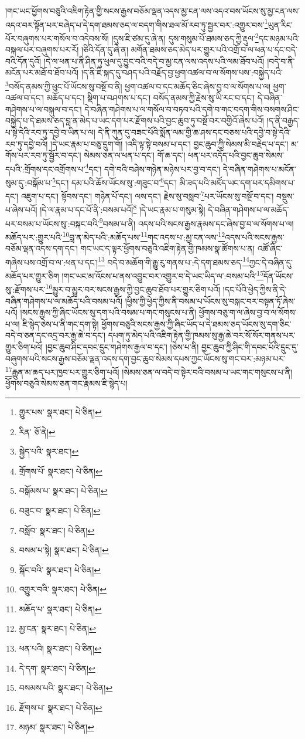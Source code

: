 །གང་ཡང་ཕྱོགས་བཅུའི་འཇིག་རྟེན་གྱི་སངས་རྒྱས་བཅོམ་ལྡན་འདས་མྱ་ངན་ལས་འདའ་བས་ཡོངས་སུ་མྱ་ངན་ལས་འདའ་བར་སྟོན་པར་བཞེད་པ་དེ་དག་ཐམས་ཅད་ལ་བདག་གིས་ཐལ་མོ་རབ་ཏུ་སྦྱར་བར་:འགྱུར་བས་\footnote{གྱུར་པས་  སྣར་ཐང་།  པེ་ཅིན། }ཡུན་རིང་པོར་བཞུགས་པར་གསོལ་བ་འདེབས་སོ། །དུས་ཇི་ཙམ་དུ་ཞེ་ན། དུས་གསུམ་པོ་ཐམས་ཅད་ཀྱི་རྡུལ་\footnote{རིན་  ཅོ་ནེ། }དང་མཉམ་པའི་བསྐལ་པར་བཞུགས་པར་རོ། །ཅིའི་དོན་དུ་ཞེ་ན། མགོན་ཐམས་ཅད་མེད་པར་གྱུར་པའི་འགྲོ་བ་ལ་ཕན་པ་དང་བདེ་བའི་དོན་དུའོ། །དེ་ལ་ཕན་པ་ནི་ཤིན་ཏུ་ཕུལ་དུ་བྱུང་བའི་བདེ་བ་མྱ་ངན་ལས་འདས་པའི་ལམ་ཐོབ་པའོ། །བདེ་བ་ནི་མངོན་པར་མཐོ་བ་ཐོབ་པའོ། །ད་ནི་ཇི་སྐད་དུ་བཤད་པའི་བརྗོད་བྱ་ཕྱག་འཚལ་བ་ལ་སོགས་པས་:བསྐྱེད་པའི་\footnote{སྐྱེད་པའི་  སྣར་ཐང་། }བསོད་ནམས་ཀྱི་ཕུང་པོ་ཡོངས་སུ་བསྔོ་བ་ནི། ཕྱག་འཚལ་བ་དང་མཆོད་ཅིང་ཞེས་བྱ་བ་ལ་སོགས་པ་ལ། ཕྱག་འཚལ་བ་དང་། མཆོད་པ་དང་། སྡིག་པ་བཤགས་པ་དང་། བསོད་ནམས་ཀྱི་རྗེས་སུ་ཡི་རང་བ་དང་། དེ་བཞིན་གཤེགས་པ་ལ་བསྐུལ་བ་དང་། དེ་བཞིན་གཤེགས་པ་ལ་གསོལ་བ་བཏབ་པའི་དགེ་བ་གང་བདག་གིས་བསགས་ཤིང་བསྐྱེད་པ་དེ་ཐམས་ཅད་བླ་ན་མེད་པ་ཡང་དག་པར་རྫོགས་པའི་བྱང་ཆུབ་ཏུ་བསྔོ་བར་བགྱིའོ་ཞེས་པའོ། །ད་ནི་བརྒྱད་པ་སྟེ་དེའི་རབ་ཏུ་དབྱེ་བ་ཡིན་པ་ལ། དེ་ནི་ཀུན་དུ་བཟང་པོའི་སྨོན་ལམ་གྱི་ཆ་ཤས་དང་བཅས་པའི་དབྱེ་བ་སྟེ་དེའི་རབ་ཏུ་དབྱེ་བའོ། །དེ་ཡང་རྣམ་པ་བཅུ་དྲུག་གོ། །འདི་ལྟ་སྟེ་བསམ་པ་དང་། བྱང་ཆུབ་ཀྱི་སེམས་མི་བརྗེད་པ་དང་། མ་གོས་པར་རབ་ཏུ་སྦྱོར་བ་དང་། སེམས་ཅན་ལ་ཕན་པ་དང་། གོ་ཆ་དང་། ཕན་པར་འདོད་པའི་བྱང་ཆུབ་སེམས་དཔའི་:གྲོགས་དང་འགྲོགས་པ་\footnote{གྲོགས་པོ་  སྣར་ཐང་།  པེ་ཅིན། }དང་། དགེ་བའི་བཤེས་གཉེན་མཉེས་པར་བྱ་བ་དང་། དེ་བཞིན་གཤེགས་པ་མངོན་སུམ་དུ་:བསྒོམ་པ་\footnote{བསྒོམས་པ་  སྣར་ཐང་།  པེ་ཅིན། }དང་། དམ་པའི་ཆོས་ཡོངས་སུ་:གཟུང་བ་\footnote{བཟུང་བ་  སྣར་ཐང་།  པེ་ཅིན། }དང་། མི་ཟད་པའི་མཛོད་ཡང་དག་པར་དམིགས་པ་དང་། འཇུག་པ་དང་། སྟོབས་དང་། གཉེན་པོ་དང་། ལས་དང་། རྗེས་སུ་བསླབ་\footnote{བསློབ་  སྣར་ཐང་།  པེ་ཅིན། }པར་ཡོངས་སུ་བསྔོ་བ་དང་། བསྡུས་པ་ཞེས་པའོ། །དེ་ལ་རྣམ་པ་དང་པོ་ནི་:བསམ་པའོ།\footnote{བསམ་པ་སྟེ།  སྣར་ཐང་།  པེ་ཅིན། } །དེ་ཡང་རྣམ་པ་གསུམ་སྟེ། དེ་བཞིན་གཤེགས་པ་ལ་མཆོད་པར་བསམ་པ་ཡོངས་སུ་:བསྐང་བའི་\footnote{སྐོང་བའི་  སྣར་ཐང་།  པེ་ཅིན། }བསམ་པ་ནི། འདས་པའི་སངས་རྒྱས་རྣམས་དང་ཞེས་བྱ་བ་ལ་སོགས་པ་ལ། མཆོད་པར་:གྱུར་པའི་\footnote{འགྱུར་བའི་  སྣར་ཐང་།  པེ་ཅིན། }བླ་ན་མེད་པའི་:མཆོད་པས་\footnote{མཆོད་པ་  སྣར་ཐང་།  པེ་ཅིན། }གང་འདས་པ་:མྱ་ངན་ལས་\footnote{མྱ་ངན་  སྣར་ཐང་།  པེ་ཅིན། }འདས་པའི་སངས་རྒྱས་བཅོམ་ལྡན་འདས་དག་དང་། གང་ཡང་ད་ལྟར་ཕྱོགས་བཅུའི་འཇིག་རྟེན་གྱི་ཁམས་སྣ་ཚོགས་པ་ན། འཚོ་ཞིང་གཞེས་པས་འགྲོ་བ་ལ་:ཕན་པ་དང་།\footnote{ཕན་པའི།  སྣར་ཐང་།  པེ་ཅིན། } བདེ་བ་མཆོག་གི་རྒྱུ་རུ་གནས་པ་:དེ་དག་ཐམས་ཅད་\footnote{དེ་དག་  སྣར་ཐང་།  པེ་ཅིན། }ཀྱང་དེ་བཞིན་དུ་མཆོད་པར་གྱུར་ཅིག །གང་ཡང་མ་འོངས་པ་ནས་འབྱུང་བར་འགྱུར་བ་དེ་ཡང་ཡིད་ལ་:བསམ་པའི་\footnote{བསམས་པའི་  སྣར་ཐང་།  པེ་ཅིན། }དོན་ཡོངས་སུ་:རྫོགས་པར་\footnote{རྫོགས་པ་  སྣར་ཐང་།  པེ་ཅིན། }མྱུར་བ་མྱུར་བར་སངས་རྒྱས་ཀྱི་བྱང་ཆུབ་ཐོབ་པར་གྱུར་ཅིག་པའོ། །དང་པོའི་ཕྱེད་ཀྱིས་ནི་དེ་བཞིན་གཤེགས་པ་ལ་མཆོད་པའི་བསམ་པའོ། །ཕྱིས་ཀྱི་ཕྱེད་ཀྱིས་ནི་བསམ་པ་ཡོངས་སུ་བསྐང་བར་བསྟན་ཏོ་ཞེས་པའོ། །སངས་རྒྱས་ཀྱི་ཞིང་ཡོངས་སུ་དག་པའི་བསམ་པ་གང་གསུངས་པ་ནི། ཕྱོགས་བཅུ་ག་ལ་ཞེས་བྱ་བ་ལ་སོགས་པ་ལ། ཇི་སྙེད་ཅེས་པ་ནི་གང་དག་སྟེ། ཕྱོགས་བཅུའི་སངས་རྒྱས་ཀྱི་ཞིང་ཡོད་པ་དེ་ཐམས་ཅད་ཡོངས་སུ་དག་ཅིང་བདེ་བ་ཅན་དང་འདྲ་བར་རྒྱ་ཆེ་བ་དང་། དཔག་ཏུ་མེད་པའི་འཇིག་རྟེན་གྱི་ཁམས་སུ་རྒྱ་ཆེ་བར་སོ་སོར་གནས་པར་གྱུར་ཅིག་པའོ། །བྱང་ཆུབ་ཤིང་དབང་དྲུང་གཤེགས་རྒྱལ་བ་དང་། །ཅེས་པ་ནི། བྱང་ཆུབ་ཀྱི་ཤིང་གི་དབང་པོའི་དྲུང་དུ་བཞུགས་པའི་སངས་རྒྱས་བཅོམ་ལྡན་འདས་དག་བྱང་ཆུབ་སེམས་དཔས་ཀྱང་ཡོངས་སུ་གང་བར་:མཉམ་པར་\footnote{མཉམ་  སྣར་ཐང་།  པེ་ཅིན། }རྒྱུན་མ་ཆད་པར་ཁྱབ་པར་གྱུར་ཅིག་པའོ། །སེམས་ཅན་ལ་བདེ་བ་སྟེར་བའི་བསམ་པ་ཡང་གང་གསུངས་པ་ནི། ཕྱོགས་བཅུའི་སེམས་ཅན་གང་རྣམས་ཇི་སྙེད་པ། 